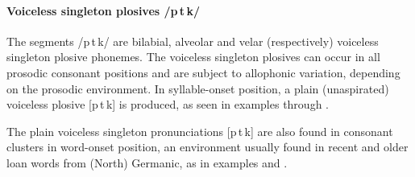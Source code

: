\paragraph{Voiceless singleton plosives /p\,t\,k/}\label{ptk}
The segments /p\,t\,k/ are bilabial, alveolar and velar (respectively) voiceless singleton plosive phonemes. %
The voiceless singleton plosives can occur in all prosodic consonant positions and are subject to allophonic variation, depending on the prosodic environment. In syllable-onset position, a plain (unaspirated) voiceless plosive [p\,t\,k] is produced, as seen in examples  through . %

The plain voiceless singleton pronunciations [p\,t\,k] %
are also found in consonant clusters in word-onset position, an environment usually found in recent and older loan words from (North) Germanic, as in examples  and . %

